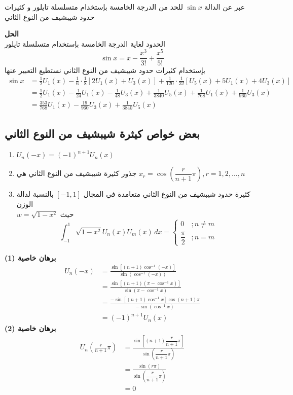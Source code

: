 \begin{example}
	عبر عن الدالة $\sin x$ للحد من الدرجة الخامسة بإستخدام متسلسلة تايلور و كثيرات حدود شيبشيف من النوع الثاني
\end{example}
\noindent
\textbf{الحل}\\
\noindent
الحدود لغاية الدرجة الخامسة بإستخدام متسلسلة تايلور 
\[
\sin x = x - \frac{x^3}{3!} + \frac{x^5}{5!}
\]
بإستخدام كثيرات حدود شيبشيف من النوع الثاني نستطيع التعبير عنها
\begin{align*}
	\sin x &= \frac{1}{2} U_1(x) - \frac{1}{6}\cdot\frac{1}{8}[2U_1(x) + U_3(x)] + \frac{1}{120}\cdot\frac{1}{32}[U_5(x) + 5U_1(x) + 4U_3(x)]\\
	&= \frac{1}{2}U_1(x) - \frac{1}{24}U_1(x) - \frac{1}{48}U_3(x) + \frac{1}{3840}U_5(x)  + \frac{1}{768} U_1(x) + \frac{1}{960} U_3(x)\\
	&= \frac{353}{768} U_1(x) - \frac{19}{960}U_3(x) + \frac{1}{3840} U_5(x)
\end{align*}

\subsection*{بعض خواص كيثرة شيبشيف من النوع الثاني}
\begin{enumerate}
	\item $U_n(-x) = (-1)^{n+1} U_n(x)$
	\item جذور كثيرة شيبشيف من النوع الثاني هي \quad $x_r = \cos\left(\dfrac{r}{n+1}\pi\right), r=1,2,\dots,n$
	\item كثيرة حدود شيبشيف من النوع الثاني متعامدة في المجال $[-1,1]$ بالنسبة لدالة الوزن \\$w = \sqrt{1-x^2}$ حيث
	\[
	\int_{-1}^{1} \sqrt{1-x^2} U_n(x) U_m(x)\, dx = \begin{cases}
		0 & ;n\neq m \\
		\dfrac{\pi}{2} & ; n = m
	\end{cases}
	\]
\end{enumerate}
\textbf{برهان خاصية (1)}
\begin{align*}
	U_n(-x) &  = \frac{\sin[(n+1)\cos^{-1}(-x)]}{\sin(\cos^{-1}(-x))}\\[5pt]
	&= \frac{\sin[(n+1)(\pi-\cos^{-1}x)]}{\sin(\pi-\cos^{-1}x)}\\[5pt]
	&= \frac{-\sin[(n+1)\cos^{-1}x]\cos(n+1)\pi}{-\sin(\cos^{-1}x)}\\[5pt]
	&= (-1)^{n+1}U_n(x)
\end{align*}
\textbf{برهان خاصية (2)}
\begin{align*}
	U_n\left(\frac{r}{n+1}\pi\right) &= \frac{\sin\left[(n+1)\dfrac{r}{n+1}\pi\right]}{\sin\left(\dfrac{r}{n+1}\pi\right)}\\[5pt]
	&= \frac{\sin(r\pi)}{\sin\left(\dfrac{r}{n+1}\pi\right)}\\[5pt]
	&= 0
\end{align*}

